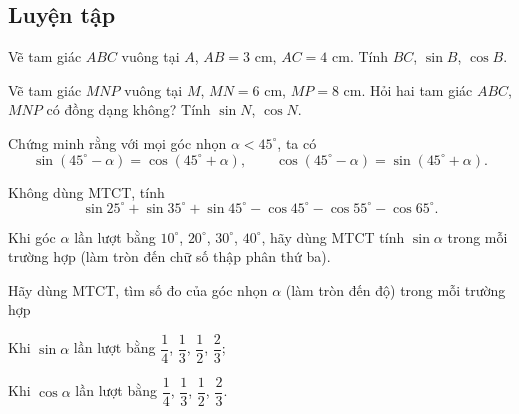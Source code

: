 \begin{practice}
    \subsection{Luyện tập}

    \begin{questions}[series=SBT]
        \item
        \begin{questions}
            \item Vẽ tam giác $ABC$ vuông tại $A$, $AB=3$ cm, $AC=4$ cm. Tính $BC$, $\sin B$, $\cos B$.

            \answerline
            \answerline

            \item Vẽ tam giác $MNP$ vuông tại $M$, $MN=6$ cm, $MP=8$ cm. Hỏi hai tam giác $ABC$, $MNP$ có đồng dạng không? Tính $\sin N$, $\cos N$.

            \answerline
            \answerline
        \end{questions}

        \item
        \begin{questions}
            \item Chứng minh rằng với mọi góc nhọn $\alpha<45^\circ$, ta có
            \[
                \sin(45^\circ-\alpha)=\cos(45^\circ+\alpha),\qquad
                \cos(45^\circ-\alpha)=\sin(45^\circ+\alpha).
            \]

            \answerline
            \answerline

            \item Không dùng MTCT, tính
            \[
                \sin25^\circ+\sin35^\circ+\sin45^\circ-\cos45^\circ-\cos55^\circ-\cos65^\circ.
            \]

            \answerline
        \end{questions}

        \item Khi góc $\alpha$ lần lượt bằng $10^\circ$, $20^\circ$, $30^\circ$, $40^\circ$, hãy dùng MTCT tính $\sin\alpha$ trong mỗi trường hợp (làm tròn đến chữ số thập phân thứ ba).

        \answerline

        \item Hãy dùng MTCT, tìm số đo của góc nhọn $\alpha$ (làm tròn đến độ) trong mỗi trường hợp
        \begin{questions}
            \item Khi $\sin\alpha$ lần lượt bằng $\dfrac{1}{4}$, $\dfrac{1}{3}$, $\dfrac{1}{2}$, $\dfrac{2}{3}$;
            \item Khi $\cos\alpha$ lần lượt bằng $\dfrac{1}{4}$, $\dfrac{1}{3}$, $\dfrac{1}{2}$, $\dfrac{2}{3}$.
        \end{questions}


\end{questions}
\end{practice}
